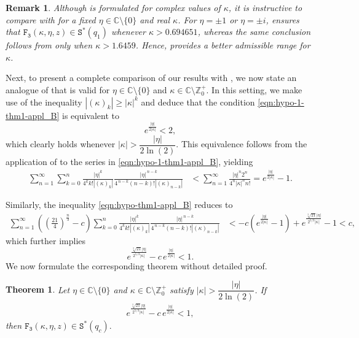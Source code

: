 \documentclass[a4paper,11pt,reqno]{amsart}
\newtheorem{theorem}{Theorem}[section]
\newtheorem{remark}{Remark}[section]
\begin{document}
\begin{remark}\label{remark-1}
 Although  is formulated for complex values of $\kappa$, it is instructive to compare  with  for a fixed $\eta \in \mathbb{C} \setminus \{0\}$ and real $\kappa$. 
For $\eta = \pm 1$ or $\eta = \pm i$,  ensures that $\mathtt{F_3}(\kappa, \eta, z) \in \mathtt{S}^{\ast}(q_1)$ whenever $\kappa > 0.694651$, whereas the same conclusion follows from  only when $\kappa > 1.6459$. 
Hence,  provides a better admissible range for $\kappa$.
\end{remark}

Next, to present a complete comparison of our results with , we now state an analogue of  that is valid for $\eta \in \mathbb{C}\setminus\{0\}$ and $\kappa \in \mathbb{C}\setminus\mathbb{Z}_0^{+}$. 
In this setting, we make use of the inequality $|(\kappa)_k| \geq |\kappa|^{k}$ and deduce that the condition \eqref{eqn:hypo-1-thm1-appl_B} is equivalent to
\[
e^{\frac{|\eta|}{2|\kappa|}} < 2,
\]
which clearly holds whenever $|\kappa| > \dfrac{|\eta|}{2\ln(2)}$. 
This equivalence follows from the application of  to the series in \eqref{eqn:hypo-1-thm1-appl_B}, yielding
\begin{align*}
\sum_{n=1}^{\infty}\sum_{k=0}^n 
\frac{|\eta|^{k}}{4^{k} k! |(\kappa)_{k}|}
\frac{|\eta|^{\,n-k}}{4^{\,n-k} (n-k)! |(\kappa)_{n-k}|}
&< 
\sum_{n=1}^{\infty} \frac{|\eta|^{n} 2^n}{4^n |\kappa|^{n} n!}
= e^{\frac{|\eta|}{2|\kappa|}} - 1.
\end{align*}

Similarly, the inequality \eqref{eqn:hypo-thm1-appl_B} reduces to
\begin{align*}
\sum_{n=1}^{\infty}
\left( \left(\tfrac{21}{4}\right)^{\tfrac{n}{3}} - c \right)
\sum_{k=0}^n 
\frac{|\eta|^{k}}{4^{k} k! |(\kappa)_{k}|}
\frac{|\eta|^{\,n-k}}{4^{\,n-k} (n-k)! |(\kappa)_{n-k}|}
&< 
-c\left( e^{\frac{|\eta|}{2|\kappa|}} - 1 \right)
+ e^{\frac{\sqrt[3]{21}|\eta|}{2^{5/3}|\kappa|}} - 1 < c,
\end{align*}
which further implies
\[
e^{\frac{\sqrt[3]{21}|\eta|}{2^{5/3}|\kappa|}} - c\, e^{\frac{|\eta|}{2|\kappa|}} < 1.
\]
We now formulate the corresponding theorem without detailed proof.

\begin{theorem}\label{thm:thm1-appl_B-complex}
Let $\eta \in \mathbb{C}\setminus\{0\}$ and $\kappa \in \mathbb{C}\setminus\mathbb{Z}_0^{+}$ satisfy $|\kappa| > \dfrac{|\eta|}{2\ln(2)}$. 
If
\begin{align}\label{eqn:hypo-1-thm1-appl_B-complex}
e^{\frac{\sqrt[3]{21}|\eta|}{2^{5/3}|\kappa|}} - c\, e^{\frac{|\eta|}{2|\kappa|}}< 1, 
\end{align}
then $\mathtt{F_3}(\kappa, \eta, z) \in \mathtt{S}^{\ast}(q_c).$
\end{theorem}
\end{document}
